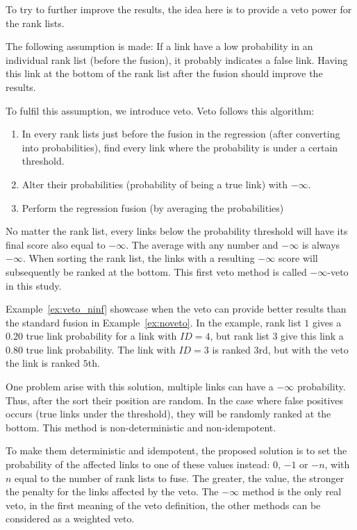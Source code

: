 To try to further improve the results, the idea here is to provide a veto power for the rank lists.

The following assumption is made:
If a link have a low probability in an individual rank list (before the fusion), it probably indicates a false link.
Having this link at the bottom of the rank list after the fusion should improve the results.

To fulfil this assumption, we introduce veto. Veto follows this algorithm:

\begin{enumerate}
  \item In every rank lists just before the fusion in the regression (after converting into probabilities), find every link where the probability is under a certain threshold.
  \item Alter their probabilities (probability of being a true link) with $-\infty$.
  \item Perform the regression fusion (by averaging the probabilities)
\end{enumerate}

No matter the rank list, every links below the probability threshold will have its final score also equal to $-\infty$.
The average with any number and $-\infty$ is always $-\infty$.
When sorting the rank list, the links with a resulting $-\infty$ score will subsequently be ranked at the bottom.
This first veto method is called $-\infty$-veto in this study.

Example~\ref{ex:veto_ninf} showcase when the veto can provide better results than the standard fusion in Example~\ref{ex:noveto}.
In the example, rank list $1$ gives a $0.20$ true link probability for a link with $ID = 4$, but rank list $3$ give this link a $0.80$ true link probability.
The link with $ID = 3$ is ranked $3$rd, but with the veto the link is ranked $5$th.

One problem arise with this solution, multiple links can have a $-\infty$ probability.
Thus, after the sort their position are random.
In the case where false positives occurs (true links under the threshold), they will be randomly ranked at the bottom.
This method is non-deterministic and non-idempotent.

To make them deterministic and idempotent, the proposed solution is to set the probability of the affected links to one of these values instead: $0$, $-1$ or $-n$, with $n$ equal to the number of rank lists to fuse.
The greater, the value, the stronger the penalty for the links affected by the veto.
The $-\infty$ method is the only real veto, in the first meaning of the veto definition, the other methods can be considered as a weighted veto.

